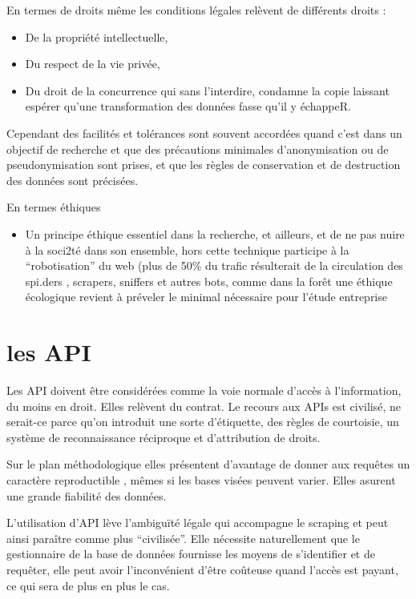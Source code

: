 \documentclass[
]{book}
\providecommand{\tightlist}{%
  \setlength{\itemsep}{0pt}\setlength{\parskip}{0pt}}
\begin{document}
En termes de droits même les conditions légales relèvent de différents droits :

\begin{itemize}
\tightlist
\item
  De la propriété intellectuelle,
\item
  Du respect de la vie privée,
\item
  Du droit de la concurrence qui sans l'interdire, condamne la copie laissant espérer qu'une transformation des données fasse qu'il y échappeR.
\end{itemize}

Cependant des facilités et tolérances sont souvent accordées quand c'est dans un objectif de recherche et que des précautions minimales d'anonymisation ou de pseudonymisation sont prises, et que les règles de conservation et de destruction des données sont précisées.

En termes éthiques

\begin{itemize}
\tightlist
\item
  Un principe éthique essentiel dans la recherche, et ailleurs, et de ne pas nuire à la soci2té dans son ensemble, hors cette technique participe à la ``robotisation'' du web (plus de 50\% du trafic résulterait de la circulation des spi.ders , scrapers, sniffers et autres bots, comme dans la forêt une éthique écologique revient à préveler le minimal nécessaire pour l'étude entreprise
\end{itemize}

\hypertarget{les-api}{%
\section{les API}\label{les-api}}

Les API doivent être considérées comme la voie normale d'accès à l'information, du moins en droit. Elles relèvent du contrat. Le recours aux APIs est civilisé, ne serait-ce parce qu'on introduit une sorte d'étiquette, des règles de courtoisie, un système de reconnaissance réciproque et d'attribution de droits.

Sur le plan méthodologique elles présentent d'avantage de donner aux requêtes un caractère reproductible , mêmes si les bases visées peuvent varier. Elles asurent une grande fiabilité des données.

L'utilisation d'API lève l'ambiguïté légale qui accompagne le scraping et peut ainsi paraître comme plus ``civilisée''. Elle nécessite naturellement que le gestionnaire de la base de données fournisse les moyens de s'identifier et de requêter, elle peut avoir l'inconvénient d'être coûteuse quand l'accès est payant, ce qui sera de plus en plus le cas.
\end{document}
